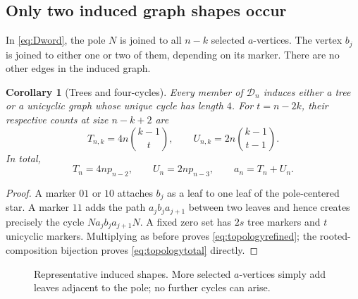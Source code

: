 \documentclass[11pt,letterpaper]{article}
\numberwithin{equation}{section}
\newtheorem{corollary}[theorem]{Corollary}
\theoremstyle{definition}
\newcommand{\CM}{\mathcal D}
\newcommand{\1}{\mathbf 1}
\begin{document}
\subsection{Only two induced graph shapes occur}
In \eqref{eq:Dword}, the pole $N$ is joined to all $n-k$ selected $a$-vertices.
The vertex $b_j$ is joined to either one or two of them, depending on its marker.
There are no other edges in the induced graph.

\begin{corollary}[Trees and four-cycles]\label{cor:topology}
Every member of $\CM_n$ induces either a tree or a unicyclic graph whose unique
cycle has length $4$. For $t=n-2k$, their respective counts at size $n-k+2$ are
\begin{equation}\label{eq:topologyrefined}
 T_{n,k}=4n\binom{k-1}{t},\qquad
 U_{n,k}=2n\binom{k-1}{t-1}.
\end{equation}
In total,
\begin{equation}\label{eq:topologytotal}
 T_n=4n p_{n-2},\qquad U_n=2n p_{n-3},\qquad a_n=T_n+U_n.
\end{equation}
\end{corollary}
\begin{proof}
A marker $01$ or $10$ attaches $b_j$ as a leaf to one leaf of the pole-centered
star. A marker $11$ adds the path $a_jb_ja_{j+1}$ between two leaves and hence
creates precisely the cycle $Na_jb_ja_{j+1}N$. A fixed zero set has $2s$ tree
markers and $t$ unicyclic markers. Multiplying as before proves
\eqref{eq:topologyrefined}; the rooted-composition bijection proves
\eqref{eq:topologytotal} directly.
\end{proof}

\begin{figure}[ht]
\centering
{}
\caption{Representative induced shapes. More selected $a$-vertices simply add
leaves adjacent to the pole; no further cycles can arise.}
\end{figure}
\end{document}
